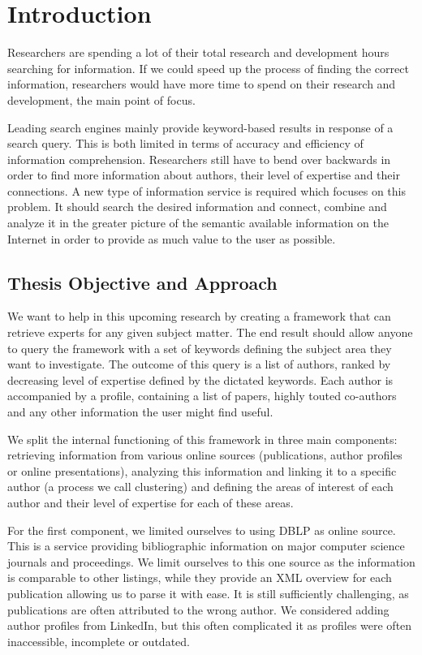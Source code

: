 \chapter{Introduction}

Researchers are spending a lot of their total research and development hours searching for information. If we could speed up the process of finding the correct information, researchers would have more time to spend on their research and development, the main point of focus.

Leading search engines mainly provide keyword-based results in response of a search query. This is both limited in terms of accuracy and efficiency of information comprehension. Researchers still have to bend over backwards in order to find more information about authors, their level of expertise and their connections. A new type of information service is required which focuses on this problem. It should search the desired information and connect, combine and analyze it in the greater picture of the semantic available information on the Internet in order to provide as much value to the user as possible.


\section{Thesis Objective and Approach}

We want to help in this upcoming research by creating a framework that can retrieve experts for any given subject matter. The end result should allow anyone to query the framework with a set of keywords defining the subject area they want to investigate. The outcome of this query is a list of authors, ranked by decreasing level of expertise defined by the dictated keywords. Each author is accompanied by a profile, containing a list of papers, highly touted co-authors and any other information the user might find useful.

We split the internal functioning of this framework in three main components: retrieving information from various online sources (publications, author profiles or online presentations), analyzing this information and linking it to a specific author (a process we call clustering) and defining the areas of interest of each author and their level of expertise for each of these areas.

For the first component, we limited ourselves to using DBLP \cite{dblp} as online source. This is a service providing bibliographic information on major computer science journals and proceedings. We limit ourselves to this one source as the information is comparable to other listings, while they provide an XML overview for each publication allowing us to parse it with ease. It is still sufficiently challenging, as publications are often attributed to the wrong author. We considered adding author profiles from LinkedIn, but this often complicated it as profiles were often inaccessible, incomplete or outdated.

